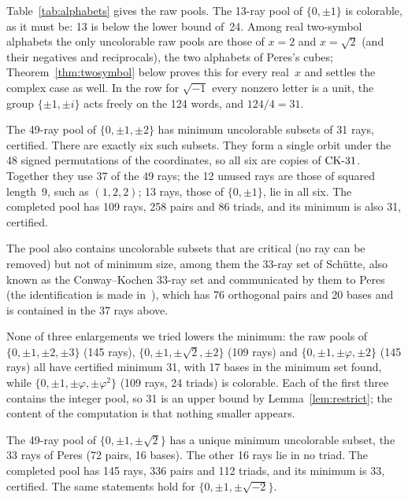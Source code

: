Table~\ref{tab:alphabets} gives the raw pools.  The 13-ray pool of $\{0,\pm1\}$ is colorable, as
it must be: 13 is below the lower bound of~24.  Among real two-symbol alphabets the
only uncolorable raw pools are those of $x=2$ and $x=\sqrt2$ (and their negatives and
reciprocals), the two alphabets of Peres's cubes; Theorem~\ref{thm:twosymbol} below proves this
for every real~$x$ and settles the complex case as well.
In the row for $\sqrt{-1}$ every nonzero letter is a unit, the group $\{\pm1,\pm i\}$ acts freely
on the 124 words, and $124/4=31$.

\begin{fact}\label{fact:integer}
The 49-ray pool of $\{0,\pm1,\pm2\}$ has minimum uncolorable subsets of 31 rays, certified.  There
are exactly six such subsets.  They form a single orbit under the 48 signed permutations of the
coordinates, so all six are copies of $\mathrm{CK}\text{-}31$.  Together they use 37 of the 49 rays; the 12 unused
rays are those of squared length~9, such as $(1,2,2)$; 13 rays, those of $\{0,\pm1\}$, lie in all
six.  The completed pool has 109 rays, 258 pairs and 86 triads, and its minimum is also 31,
certified.
\end{fact}

The pool also contains uncolorable subsets
that are critical (no ray can be removed) but not of minimum size, among them the 33-ray set
of Sch\"utte, also known as the Conway--Kochen 33-ray set and communicated by them to
Peres~\cite{Peres1991} (the identification is made in~\cite{TrandafirCabello2025}), which has 76
orthogonal pairs and
20 bases and is contained in the 37 rays above.

None of three enlargements we tried lowers the minimum: the raw pools of $\{0,\pm1,\pm2,\pm3\}$ (145 rays),
$\{0,\pm1,\pm\sqrt2,\pm2\}$ (109 rays) and $\{0,\pm1,\pm\varphi,\pm2\}$ (145 rays) all have
certified minimum 31, with 17 bases in the minimum set found, while
$\{0,\pm1,\pm\varphi,\pm\varphi^2\}$ (109 rays, 24 triads) is colorable.  Each of the first three
contains the integer pool, so 31 is an upper bound by Lemma~\ref{lem:restrict}; the content of
the computation is that nothing smaller appears.

\begin{fact}\label{fact:peres}
The 49-ray pool of $\{0,\pm1,\pm\sqrt2\}$ has a unique minimum uncolorable subset, the 33 rays of
Peres (72 pairs, 16 bases).  The other 16 rays lie in no triad.  The completed pool has 145 rays,
336 pairs and 112 triads, and its minimum is 33, certified.  The same statements hold for
$\{0,\pm1,\pm\sqrt{-2}\}$.
\end{fact}

